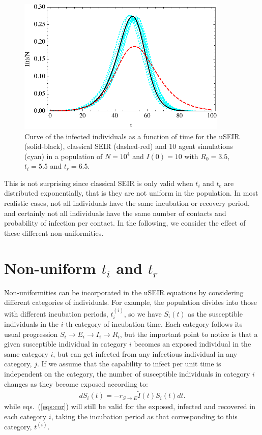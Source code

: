 \documentclass[a4paper,oneside,11pt]{article}
\begin{document}
\begin{figure}[h!]
  \centering
  \includegraphics[width=10cm]{fixedraw.pdf}
  \caption{ Curve of the infected individuals as a function of time for the uSEIR (solid-black), classical SEIR (dashed-red) and 10 agent simulations (cyan) in a  population of $N=10^4$ and $I(0)=10$ with $R_0=3.5$, $t_i=5.5$ and $t_r=6.5$.  }
  \label{fig:fixed}
   \end{figure}

  This is not surprising since classical SEIR is only valid when  $t_i$ and $t_e$ are distributed exponentially, that is they are not uniform in the population. In most realistic cases, not all individuals have the same incubation or recovery period, and certainly not all individuals have the same number of contacts and probability of infection per contact. In the following, we consider the effect of these different non-uniformities.

\section{Non-uniform $t_i$ and $t_r$ }
\label{sec:titr}

 Non-uniformities can be incorporated in the uSEIR equations by considering different categories of individuals. For example, the population divides   into those with different incubation periods, $t_i^{(i)}$, so we have $S_i(t)$ as the susceptible individuals in the $i$-th category of incubation time. Each category follows its usual progression $S_i\rightarrow E_i \rightarrow I_i \rightarrow R_i$, but the important point to notice is that a given susceptible individual in category $i$ becomes an exposed individual in the same category $i$, but can get infected from any infectious individual in any category, $j$. If we assume that the capability to infect per unit time is independent on the category, the number of susceptible individuals in category $i$ changes as they become exposed according to:
\begin{eqnarray}
d S_i(t) = - r_{S\rightarrow E} \tilde{I}(t) S_i(t) dt.
\end{eqnarray}
while eqs.~(\ref{eqs:cor}) will still be valid for the exposed, infected and recovered in each category $i$, taking the incubation period as that corresponding to this category, $t^{(i)}$.
\end{document}
